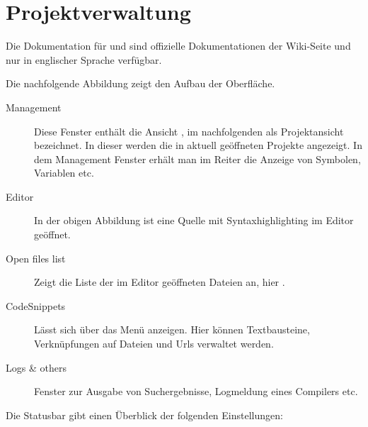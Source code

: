 \chapter{\codeblocks Projektverwaltung}

Die Dokumentation für  und  sind offizielle Dokumentationen der \codeblocks Wiki-Seite und nur in englischer Sprache verfügbar.

Die nachfolgende Abbildung zeigt den Aufbau der \codeblocks Oberfläche.


\begin{description}
\item[Management] Diese Fenster enthält die Ansicht , im nachfolgenden als Projektansicht bezeichnet. In dieser werden die in \codeblocks aktuell geöffneten Projekte angezeigt. In dem Management Fenster erhält man im Reiter  die Anzeige von Symbolen, Variablen etc.
\item[Editor] In der obigen Abbildung ist eine Quelle  mit Syntaxhighlighting im Editor geöffnet.
\item[Open files list] Zeigt die Liste der im Editor geöffneten Dateien an, hier .
\item[CodeSnippets] Lässt sich über das Menü  anzeigen. Hier können Textbausteine, Verknüpfungen auf Dateien und Urls verwaltet werden.
\item[Logs \& others] Fenster zur Ausgabe von Suchergebnisse, Logmeldung eines Compilers etc.
\end{description}

Die Statusbar gibt einen Überblick der folgenden Einstellungen:

